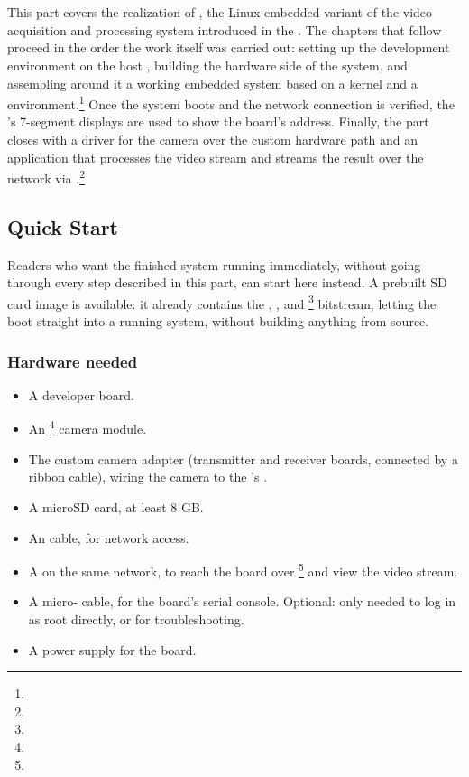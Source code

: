 \chapter{}
\label{chap:fpgalix-intro}

This part covers the realization of , the Linux-embedded variant of the video acquisition and processing system introduced in the . The chapters that follow proceed in the order the work itself was carried out: setting up the development environment on the host , building the hardware side of the system, and assembling around it a working embedded system based on a  kernel and a  environment.\footnote{} Once the system boots and the network connection is verified, the 's 7-segment displays are used to show the board's  address. Finally, the part closes with a driver for the camera over the custom hardware path and an application that processes the video stream and streams the result over the network via .\footnote{}

\section{Quick Start}
\label{sec:fpgalix-quick-start}

Readers who want the finished system running immediately, without going through every step described in this part, can start here instead. A prebuilt SD card image is available: it already contains the , ,  and \footnote{} bitstream, letting the  boot straight into a running system, without building anything from source.

\subsection{Hardware needed}

\begin{itemize}
    \item A  developer board.
    \item An \footnote{} camera module.
    \item The custom camera adapter (transmitter and receiver boards, connected by a ribbon cable), wiring the camera to the 's .
    \item A microSD card, at least 8 GB.
    \item An  cable, for network access.
    \item A  on the same network, to reach the board over \footnote{} and view the video stream.
    \item A micro- cable, for the board's serial console. Optional: only needed to log in as root directly, or for troubleshooting.
    \item A power supply for the board.
\end{itemize}

